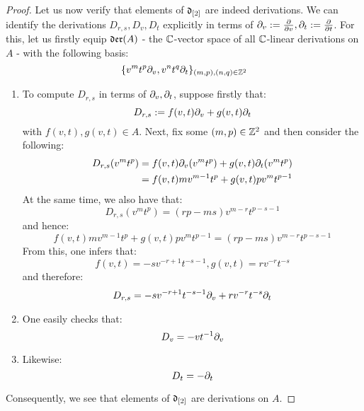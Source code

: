 \begin{proof}
                Let us now verify that elements of $\mathfrak{d}_{[2]}$ are indeed derivations. We can identify the derivations $D_{r, s}, D_v, D_t$ explicitly in terms of $\partial_v := \frac{\partial}{\partial v}, \partial_t := \frac{\partial}{\partial t}$. For this, let us firstly equip $\mathfrak{der}(A)$ - the $\mathbb{C}$-vector space of all $\mathbb{C}$-linear derivations on $A$ - with the following basis:
                    $$\{ v^m t^p \partial_v, v^n t^q \partial_t \}_{(m, p), (n, q) \in \mathbb{Z}^2}$$
                \begin{enumerate}
                    \item To compute $D_{r, s}$ in terms of $\partial_v, \partial_t$, suppose firstly that:
                        $$D_{r, s} := f(v, t) \partial_v + g(v, t) \partial_t$$
                    with $f(v, t), g(v, t) \in A$. Next, fix some $(m, p) \in \mathbb{Z}^2$ and then consider the following:
                        $$
                            \begin{aligned}
                                D_{r, s}( v^m t^p ) & = f(v, t) \partial_v( v^m t^p ) + g(v, t) \partial_t( v^m t^p )
                                \\
                                & = f(v, t) m v^{m - 1} t^p + g(v, t) p v^m t^{p - 1}
                            \end{aligned}
                        $$
                    At the same time, we also have that:
                        $$D_{r, s}(v^m t^p) = ( rp - ms ) v^{m - r} t^{p - s - 1}$$
                    and hence:
                        $$f(v, t) m v^{m - 1} t^p + g(v, t) p v^m t^{p - 1} = ( rp - ms ) v^{m - r} t^{p - s - 1}$$
                    From this, one infers that:
                        $$f(v, t) = -s v^{-r + 1} t^{-s - 1}, g(v, t) = r v^{-r} t^{-s}$$
                    and therefore:
                        $$D_{r, s} = -s v^{-r + 1} t^{-s - 1} \partial_v + r v^{-r} t^{-s} \partial_t$$
                    \item One easily checks that:
                        $$D_v = -v t^{-1} \partial_v$$
                    \item Likewise:
                        $$D_t = -\partial_t$$
                \end{enumerate}
                Consequently, we see that elements of $\mathfrak{d}_{[2]}$ are derivations on $A$.
            \end{proof}
